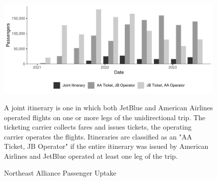 \documentclass{article}
\begin{document}
    	 \begin{figure}
        \caption{Northeast Alliance Passenger Uptake}
        \label{fig:NEA_Uptake}
        \begin{center}
            \includegraphics[width = \linewidth]{05.Figures/NEA_OperationsGraph}
        \end{center}
        \vspace{-8mm}
        \footnotesize{A joint itinerary is one in which both JetBlue and American Airlines operated flights on one or more legs of the unidirectional trip. The ticketing carrier collects fares and issues tickets, the operating carrier operates the flights. Itineraries are classified as an "AA Ticket, JB Operator" if the entire itinerary was issued by American Airlines and JetBlue operated at least one leg of the trip.}
    \end{figure}
\end{document}
